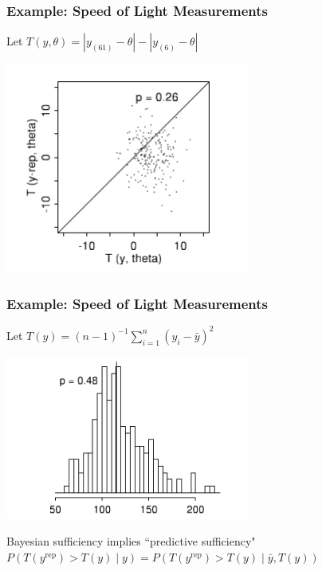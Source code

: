 \documentclass{beamer}
\begin{document}
\begin{frame}
\frametitle{Example: Speed of Light Measurements}

Let $T(y,\theta) = |y_{(61)} - \theta| - |y_{(6)} - \theta|$

\begin{center}
\includegraphics[width=80mm]{T_scatter.png}
\end{center}

\end{frame}

\begin{frame}
\frametitle{Example: Speed of Light Measurements}

Let $T(y) = (n-1)^{-1}\sum_{i=1}^n (y_i-\bar{y})^2$

\begin{center}
\includegraphics[width=80mm]{s2_hist.png}
\end{center}

Bayesian sufficiency implies ``predictive sufficiency" \\
$P(T(y^{\text{rep} } ) > T(y ) \mid y) = P(T(y^{\text{rep} } ) > T(y) \mid \bar{y}, T(y))$


\end{frame}
\end{document}
